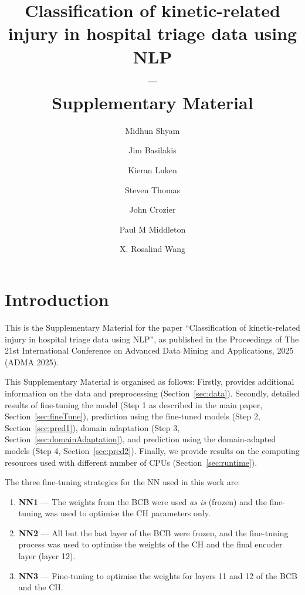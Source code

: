 \documentclass[a4paper,12pt]{article}
\title{Classification of kinetic-related injury in hospital triage data using NLP\\
-- \\
Supplementary Material}
\author{Midhun Shyam\orcidlink{0009-0006-2930-2135} \and
Jim Basilakis\orcidlink{0000-0002-7440-1320} \and
Kieran Luken\orcidlink{0000-0002-6147-693X} \and
Steven Thomas\orcidlink{0000-0002-2416-0020} \and
John Crozier\orcidlink{0000-0002-4773-8518} \and
Paul M Middleton\orcidlink{0000-0003-0760-1098} \and
X. Rosalind Wang\orcidlink{0000-0001-5454-6197}}
\date{}
\begin{document}
\maketitle

\section{Introduction}

This is the Supplementary Material for the paper ``Classification of kinetic-related injury in hospital triage data using NLP'', as published in the Proceedings of The 21st International Conference on Advanced Data Mining and Applications, 2025 (ADMA 2025).

This Supplementary Material is organised as follows: Firstly, provides additional information on the data and preprocessing (Section~\ref{sec:data}). Secondly, detailed results of fine-tuning the model (Step 1 as described in the main paper, Section~\ref{sec:fineTune}), prediction using the fine-tuned models (Step 2, Section~\ref{sec:pred1}), domain adaptation (Step 3, Section~\ref{sec:domainAdaptation}), and prediction using the domain-adapted models (Step 4, Section~\ref{sec:pred2}). Finally, we provide results on the computing resources used with different number of CPUs (Section~\ref{sec:runtime}).

The three fine-tuning strategies for the \ac{NN} used in this work are: 
\begin{enumerate}
    \item \textbf{\acf{NN1}} --- The weights from the \ac{BCB} were used \emph{as is} (frozen) and the fine-tuning was used to optimise the \ac{CH} parameters only. 
    \item \textbf{\acf{NN2}} --- All but the last layer of the \ac{BCB} were frozen, and the fine-tuning process was used to optimise the weights of the \ac{CH} and the final encoder layer (layer 12). 
    \item \textbf{\acf{NN3}} --- Fine-tuning to optimise the weights for layers 11 and 12 of the \ac{BCB} and the \ac{CH}. 
\end{enumerate}

\end{document}
